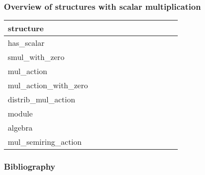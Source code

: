 \documentclass{beamer}
\newcommand{\yes}{\checkmark}
\newcommand{\no}{}
\begin{document}
	\begin{frame}[t]
	\frametitle{Overview of structures with scalar multiplication}
		\begin{tabular}{l*{11}{@{}c}}
			structure &
				 &
				 &
				 &
				 &
				 &
				 &
				 &
				 &
				 &
				 &
				\\
			\hline
			has\_scalar				&\yes	&\no	&\no	&\no	&\no	&\no	&\no	&\no	&\no	&\no	&\\
			smul\_with\_zero		&\yes	&\yes	&\yes	&\no	&\no	&\no	&\no	&\no	&\no	&\no	&\\
			mul\_action				&\yes	&\no	&\no	&\yes	&\yes	&\no	&\no	&\no	&\no	&\no	&\\
			mul\_action\_with\_zero	&\yes	&\yes	&\yes	&\yes	&\yes	&\no	&\no	&\no	&\no	&\no	&\\
			distrib\_mul\_action	&\yes	&\yes	&\no	&\yes	&\yes	&\yes	&\no	&\no	&\no	&\no	&\\
			module					&\yes	&\yes	&\yes	&\yes	&\yes	&\yes	&\yes	&\no	&\no	&\no	&\\
			algebra					&\yes	&\yes	&\yes	&\yes	&\yes	&\yes	&\yes	&\yes	&\no	&\no	&\\
			mul\_semiring\_action	&\yes	&\yes	&\no	&\yes	&\yes	&\yes	&\no	&\no	&\yes	&\yes	&\\
		\end{tabular}
	\end{frame}


	\begin{frame}[t]
	\frametitle{Bibliography}
		\printbibliography
	\end{frame}
\end{document}
